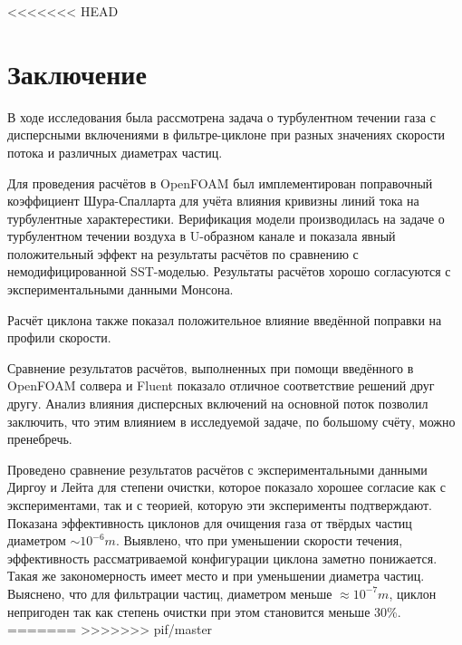 <<<<<<< HEAD
\section*{Заключение}

В ходе исследования была рассмотрена задача о турбулентном течении газа с дисперсными включениями в фильтре-циклоне при разных значениях скорости потока и различных диаметрах частиц.

Для проведения расчётов в OpenFOAM был имплементирован поправочный коэффициент Шура-Спалларта для учёта влияния кривизны линий тока на турбулентные характерестики. Верификация модели производилась на задаче о турбулентном течении воздуха в U-образном канале и показала явный положительный эффект на результаты расчётов по сравнению с немодифицированной SST-моделью. Результаты расчётов хорошо согласуются с экспериментальными данными Монсона.

Расчёт циклона также показал положительное влияние введённой поправки на профили скорости. 

Сравнение результатов расчётов, выполненных при помощи введённого в OpenFOAM солвера и Fluent показало отличное соответствие решений друг другу. Анализ влияния дисперсных включений на основной поток позволил заключить, что этим влиянием в исследуемой задаче, по большому счёту, можно пренебречь.

Проведено сравнение результатов расчётов с экспериментальными данными Диргоу и Лейта для степени очистки, которое показало хорошее согласие как с экспериментами, так и с теорией, которую эти эксперименты подтверждают. Показана эффективность циклонов для очищения газа от твёрдых частиц диаметром $\sim 10^{-6}m$. Выявлено, что при уменьшении скорости течения, эффективность рассматриваемой конфигурации циклона заметно понижается. Такая же закономерность имеет место и при уменьшении диаметра частиц. Выяснено, что для фильтрации частиц, диаметром меньше $\approx 10^{-7}m$, циклон непригоден так как степень очистки при этом становится меньше 30\%.
=======
>>>>>>> pif/master
